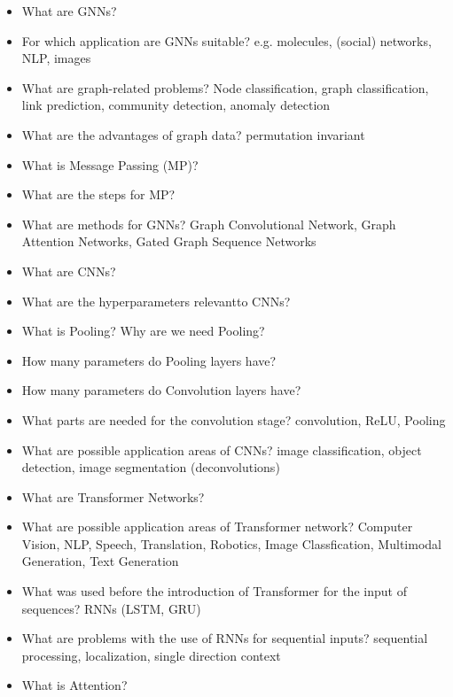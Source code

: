 \documentclass{report}
\begin{document}
\begin{itemize}
		\item What are GNNs?
		\newline 
		\item For which application are GNNs suitable?
		\newline e.g. molecules, (social) networks, NLP, images
		\item What are graph-related problems?
		\newline Node classification, graph classification, link prediction, community detection, anomaly detection
		\item What are the advantages of graph data?
		\newline permutation invariant
		\item What is Message Passing (MP)?
		\newline 
		\item What are the steps for MP?
		\newline 
		\item What are methods for GNNs?
		\newline Graph Convolutional Network, Graph Attention Networks, Gated Graph Sequence Networks
		
		\item What are CNNs?
		\newline 
		\item What are the hyperparameters relevantto CNNs?
		\newline 
		\item What is Pooling? Why are we need Pooling?
		\newline 
		\item How many parameters do Pooling layers have?
		\newline 
		\item How many parameters do Convolution layers have?
		\newline 
		\item What parts are needed for the convolution stage?
		\newline convolution, ReLU, Pooling
		\item What are possible application areas of CNNs?
		\newline image classification, object detection, image segmentation (deconvolutions)
		
		\item What are Transformer Networks?
		\newline 
		\item What are possible application areas of Transformer network?
		\newline Computer Vision, NLP, Speech, Translation, Robotics, Image Classfication, Multimodal Generation, Text Generation
		\item What was used before the introduction of Transformer for the input of sequences?
		\newline RNNs (LSTM, GRU)
		\item What are problems with the use of RNNs for sequential inputs?
		\newline sequential processing, localization, single direction context
		\item What is Attention?
		\newline 
		

\end{itemize}
\end{document}
